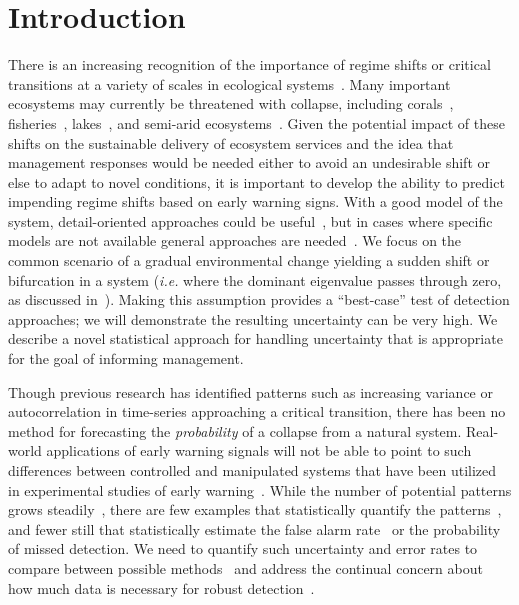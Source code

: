 \documentclass[authoryear,preprint,11pt]{elsarticle}
\begin{document}
 \section{Introduction}
There is an increasing recognition of the importance of regime shifts or critical transitions at a variety of scales in ecological systems~\citep{Holling1973, Wissel1984, Scheffer2001, Scheffer2009, Drake2010, Carpenter2011}⁠. 
Many important ecosystems may currently be threatened with collapse, including corals~\citep{Bellwood2004}, fisheries~\citep{Berkes2006}⁠, lakes~\citep{Carpenter2011}, and semi-arid ecosystems~\citep{Kefi2007}⁠. 
Given the potential impact of  these shifts on the sustainable delivery of ecosystem services
and the idea that management responses would be needed either to avoid an undesirable shift or else to adapt to novel conditions,
it is important to develop the ability to predict impending regime shifts based on early warning signs. 
With a good model of the system, detail-oriented approaches could be useful~\citep{Lenton2009},
but in cases where specific models are not available general approaches are needed~\citep{Scheffer2009}⁠.
We focus on the common scenario of a gradual environmental change yielding a sudden shift or bifurcation in a system 
(\emph{i.e.} where the dominant eigenvalue passes through zero,
as discussed in~\citet{Scheffer2001, Scheffer2009}). 
Making this assumption provides a ``best-case'' test of detection approaches;
we will demonstrate the resulting uncertainty can be very high.
We describe a novel statistical approach for handling uncertainty that is appropriate for the goal of informing management.  

Though previous research has identified patterns such as increasing variance or autocorrelation
in time-series approaching a critical transition,
there has been no method for forecasting the \emph{probability} of a collapse from a natural system.
Real-world applications of early warning signals will not be able to point to such differences between controlled and
manipulated systems that have been utilized in experimental studies of early warning~\citep{Drake2010, Carpenter2011}⁠.
While the number of potential patterns grows steadily~\citep{Carpenter2006, Dakos2008, Guttal2008, Guttal2008a, Dakos2011}, %
there are few examples that statistically quantify the patterns~\citep{Dakos2008, Dakos2011},⁠
and fewer still that statistically estimate the false alarm rate~\citep{Dakos2008} or 
the probability of missed detection⁠. 
We need to quantify such uncertainty and error rates to compare between possible methods~\citep{Contamin2009}
and address the continual concern about how much data is necessary⁠ for robust detection~\citep{Scheffer2001, Dakos2008, Carpenter2011, Scheffer2010, Inman2011}.  
\end{document}

